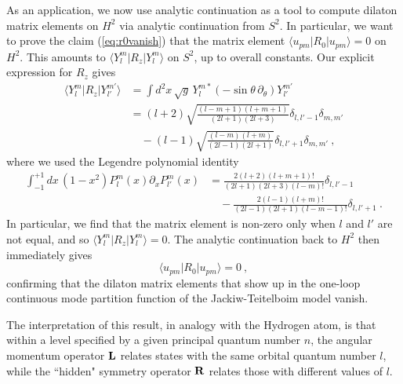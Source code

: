 \documentclass[12pt]{article}
\begin{document}
As an application, we now use analytic continuation as a tool to compute dilaton matrix elements on $H^2$ via analytic continuation from $S^2$.
In particular, we want to prove the claim (\ref{eq:r0vanish}) that the matrix element $\langle u_{pm}| R_0 |u_{pm} \rangle = 0$ on $H^2$. This amounts to
$\langle Y_l^m | R_z | Y_{l}^{m}\rangle$ on $S^2$, up to overall constants.  Our explicit expression for $R_z$ gives
\begin{equation}\begin{aligned}
\langle Y_l^m | R_z | Y_{l'}^{m'}\rangle &= \int d^2x\,\sqrt{g}\, Y_l^{m *} \left(-\sin\theta\,\partial_\theta\right) Y_{l'}^{m'} \\
	 &= (l+2)\sqrt{\frac{(l-m+1)(l+m+1)}{(2l+1)(2l+3)}} \delta_{l,l'-1} \delta_{m,m'} \\
	 &\quad - (l-1)\sqrt{\frac{(l-m)(l+m)}{(2l-1)(2l+1)}} \delta_{l,l'+1}\delta_{m,m'}~,
\end{aligned}\end{equation}
where we used the Legendre polynomial identity
\begin{equation}\begin{aligned}
	\int_{-1}^{+1}dx\,(1-x^2) P_l^m(x) \partial_x P_{l'}^{m}(x) &= \frac{2(l+2)(l+m+1)!}{(2l+1)(2l+3)(l-m)!} \delta_{l,l'-1} \\
	&\quad - \frac{2(l-1)(l+m)!}{(2l-1)(2l+1)(l-m-1)!} \delta_{l,l'+1}~.
\end{aligned}\end{equation}
In particular, we find that the matrix element is non-zero only when $l$ and $l'$ are not equal, and so $\langle Y_l^m | R_z | Y_l^m\rangle = 0$.  The analytic continuation back to $H^2$ then immediately gives
\begin{equation}
	\langle u_{pm} | R_0 | u_{pm}\rangle = 0~,
\end{equation}
confirming that the dilaton matrix elements that show up in the one-loop continuous mode partition function of the Jackiw-Teitelboim model vanish. 

The interpretation of this result, in analogy with the Hydrogen atom, is that within a level specified by a given principal quantum number $n$, 
the angular momentum operator ${\bf L}$ relates states with the same orbital quantum number $l$, while the ``hidden" symmetry operator ${\bf R}$ relates those with
different values of $l$.



\end{document}
